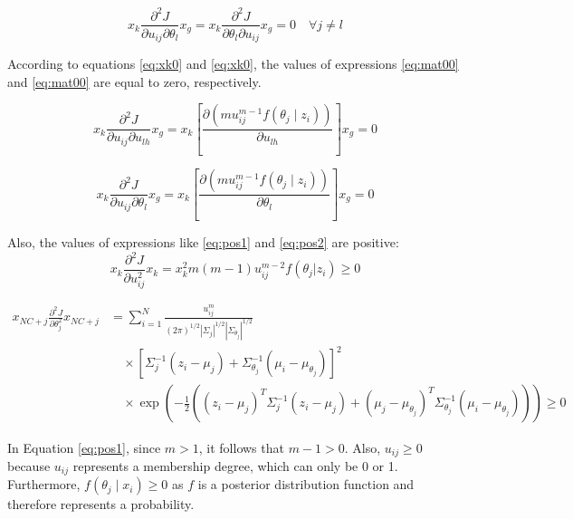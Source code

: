 \documentclass{article}
\begin{document}
\begin{equation}\label{eq:mat01}
x_k \frac{\partial^2 J}{\partial u_{ij} \partial \theta_l} x_g = x_k \frac{\partial^2 J}{\partial \theta_l \partial u_{ij}} x_g = 0 \quad \forall j \ne l
\end{equation}

According to equations \ref{eq:xk0} and \ref{eq:xk0}, the values of expressions \ref{eq:mat00} and \ref{eq:mat00} are equal to zero, respectively. 

\begin{equation}\label{eq:xk0}
x_k \frac{\partial^2 J}{\partial u_{ij} \partial u_{lh}} x_g = x_k \left[ \frac{\partial (m u_{ij}^{m-1} f(\theta_j \mid z_i))}{\partial u_{lh}} \right] x_g = 0
\end{equation}

\begin{equation}\label{eq:xk00}
x_k \frac{\partial^2 J}{\partial u_{ij} \partial \theta_l} x_g = x_k \left[ \frac{\partial (m u_{ij}^{m-1} f(\theta_j \mid z_i))}{\partial \theta_l} \right] x_g = 0 
\end{equation}

Also, the values of expressions like \ref{eq:pos1} and \ref{eq:pos2} are positive:
\begin{equation}\label{eq:pos1}
x_k \frac{\partial^2 J}{\partial u_{ij}^2} x_k = x_k^2 m (m-1) u_{ij}^{m-2} f(\theta_j | z_i) \geq 0    
\end{equation}

\begin{equation}\label{eq:pos2}
\begin{aligned}
x_{NC+j} \frac{\partial^2 J}{\partial \theta_j^2} x_{NC+j} &= \sum_{i=1}^{N} \frac{u_{ij}^m}{(2\pi)^{1/2} |\Sigma_j|^{1/2} |\Sigma_{\theta_j}|^{1/2}} \\
&\quad \times \left[ \Sigma_j^{-1}(z_i - \mu_j) + \Sigma_{\theta_j}^{-1}(\mu_i - \mu_{\theta_j}) \right]^2 \\
&\quad \times \exp\left( -\frac{1}{2} \left( (z_i - \mu_j)^T \Sigma_j^{-1} (z_i - \mu_j) + (\mu_j - \mu_{\theta_j})^T \Sigma_{\theta_j}^{-1} (\mu_i - \mu_{\theta_j}) \right) \right) \geq 0
\end{aligned}
\end{equation}

In Equation \ref{eq:pos1}, since \( m > 1 \), it follows that \( m - 1 > 0 \). Also, \( u_{ij} \geq 0 \) because \( u_{ij} \) represents a membership degree, which can only be 0 or 1. Furthermore, \( f(\theta_j \mid x_i) \geq 0 \) as \( f \) is a posterior distribution function and therefore represents a probability.
\end{document}
